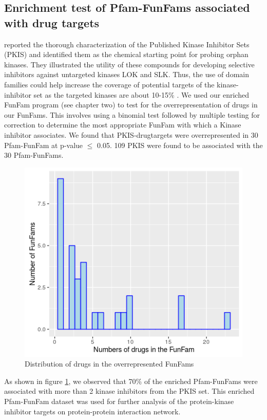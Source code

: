 \documentclass[a4paper, 11pt]{article}
\begin{document}
\subsection*{Enrichment test of Pfam-FunFams associated with drug targets}
\cite{anastassiadis2011comprehensive} reported the thorough characterization of the Published Kinase Inhibitor Sets (PKIS) and identified them as the chemical starting point for probing orphan kinases. They illustrated the utility of these compounds for developing selective inhibitors against untargeted kinases LOK and SLK. Thus, the use of domain families could help increase the coverage of potential targets of the kinase-inhibitor set as the targeted kinases are about 10-15\% . We used our enriched FunFam program (see chapter two) to test for the overrepresentation of drugs in our FunFams. This involves using a binomial test followed by multiple testing for correction to determine the most appropriate FunFam with which a Kinase inhibitor associates. We found that PKIS-drugtargets were overrepresented in 30 Pfam-FunFam at p-value $\leq$ 0.05. 109 PKIS were found to be associated with the 30 Pfam-FunFams. \\
\begin{figure}[H]
	\includegraphics[width=.8\linewidth]{figures/ffdrugdis.png}
	\centering
	\caption{Distribution of drugs in the overrepresented FunFams}
	\label{distdrugFF}
\end{figure}
As shown in figure \ref{distdrugFF}, we observed that 70\% of the enriched Pfam-FunFams were associated with more than 2 kinase inhibitors from the PKIS set. This enriched Pfam-FunFam dataset was used for further analysis of the protein-kinase inhibitor targets on protein-protein interaction network.\\
\end{document}
